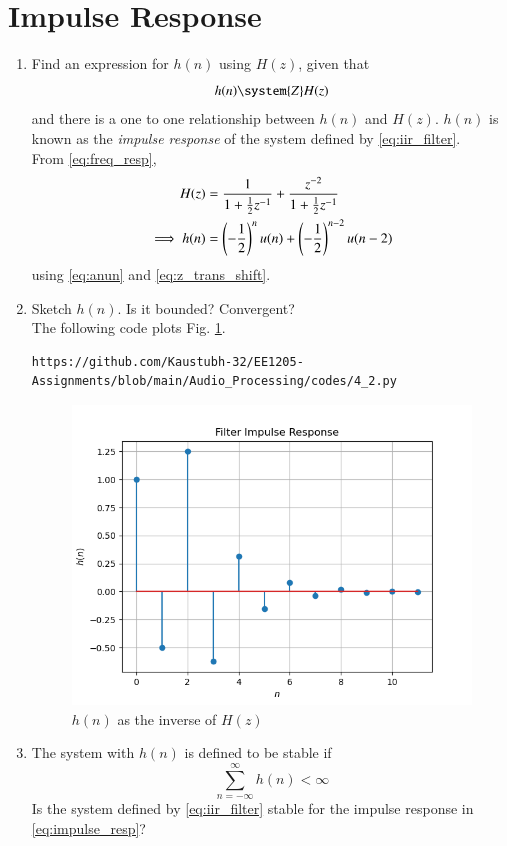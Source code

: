 \documentclass[journal,12pt,twocolumn]{IEEEtran}
\theoremstyle{remark}
\begin{document}
\section{Impulse Response}
\begin{enumerate}[label=\thesection.\arabic*]
\item \label{prob:impulse_resp}
Find an expression for $h(n)$ using $H(z)$, given that 
\begin{equation}
\label{eq:impulse_resp}
h(n) \system{Z} H(z)
\end{equation}
and there is a one to one relationship between $h(n)$ and $H(z)$. $h(n)$ is known as the {\em impulse response} of the
system defined by \eqref{eq:iir_filter}.
\\
\solution From \eqref{eq:freq_resp},
\begin{align}
H(z) &= \frac{1}{1 + \frac{1}{2}z^{-1}} + \frac{ z^{-2}}{1 + \frac{1}{2}z^{-1}}
\\
\implies h(n) &= \left(-\frac{1}{2}\right)^{n}u(n) + \left(-\frac{1}{2}\right)^{n-2}u(n-2)\label{eq:eq_h}
\end{align}
using \eqref{eq:anun} and \eqref{eq:z_trans_shift}.
\item Sketch $h(n)$. Is it bounded? Convergent? 
\\
\solution The following code plots Fig. \ref{fig:hn}.
\begin{lstlisting}
https://github.com/Kaustubh-32/EE1205-Assignments/blob/main/Audio_Processing/codes/4_2.py
\end{lstlisting}
\begin{figure}[!ht]
\centering
\includegraphics[width=\columnwidth]{4_2.png}
\caption{$h(n)$ as the inverse of $H(z)$}
\label{fig:hn}
\end{figure}
%
\item The system with $h(n)$ is defined to be stable if
\begin{equation}
\sum_{n=-\infty}^{\infty}h(n) < \infty
\end{equation}
Is the system defined by \eqref{eq:iir_filter} stable for the impulse response in \eqref{eq:impulse_resp}?


\end{enumerate}
\end{document}
